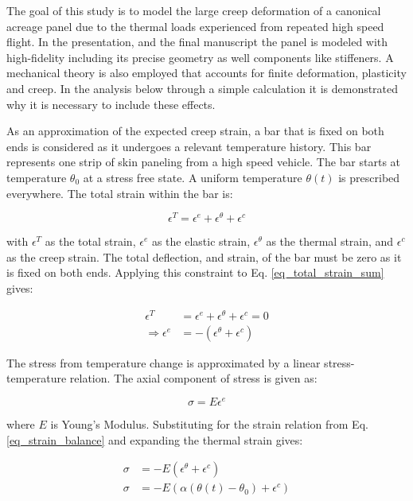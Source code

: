 \documentclass[conf]{new-aiaa}
\begin{document}
The goal of this study is to model the large creep deformation of a canonical acreage
panel due to the thermal loads experienced from repeated high speed flight.
In the presentation, and the final manuscript the panel is modeled
with high-fidelity including its precise geometry as well components 
like stiffeners. 
A mechanical theory is also employed that accounts for finite 
deformation, plasticity and creep. 
In the analysis below through a simple calculation it is demonstrated
why it is necessary to include these effects. 

As an approximation of the expected creep strain,
a bar that is fixed on both ends is considered as it 
undergoes a relevant temperature history.
This bar represents one strip of skin paneling from 
a high speed vehicle.
The bar starts at temperature $\theta_0$ at a stress free state. 
A uniform temperature $\theta(t)$ is prescribed everywhere.
The total strain within the bar is:

\begin{equation}
\epsilon^T = \epsilon^e  + \epsilon^\theta+ \epsilon^c
\label{eq_total_strain_sum}
\end{equation}

\noindent
with $\epsilon^T$ as the total strain,
$\epsilon^e$ as the elastic strain,
$\epsilon^\theta$ as the thermal strain,
and
$\epsilon^c$ as the creep strain.
The total deflection, and strain, of the bar must be zero as it 
is fixed on both ends.
Applying this constraint to Eq. \ref{eq_total_strain_sum} gives:

\begin{align}
\epsilon^T &= \epsilon^e + \epsilon^\theta + \epsilon^c = 0 \\
\Rightarrow
  \epsilon^e &= -\left( \epsilon^\theta + \epsilon^c \right)  \label{eq_strain_balance}
\end{align}

\noindent
The stress from temperature change is approximated by
a linear stress-temperature relation. 
The axial component of stress is given as:

\begin{equation}
\sigma = E  \epsilon^e 
\end{equation}

\noindent
where $E$ is Young's Modulus.
Substituting for the strain relation from Eq. \ref{eq_strain_balance} 
and expanding the thermal strain gives:

\begin{align}
\sigma &= -E \left( \epsilon^\theta + \epsilon^c \right)  \\
\sigma &= -E \left( \alpha (\theta(t) - \theta_0) + \epsilon^c \right) 
\label{eq_cauchy_stress_sum}
\end{align}
\end{document}
